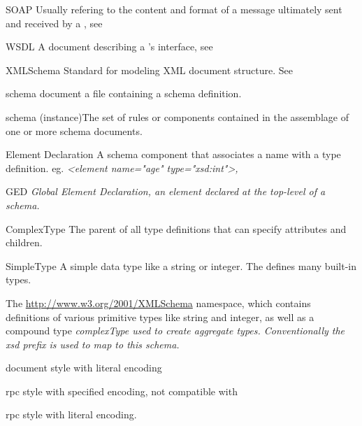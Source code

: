 \begin{definitions}
\item{SOAP \newline Usually refering to the content and format of a message ultimately
sent and received by a \WS{}, see \SOAP{}}
\item{WSDL \newline A document describing a \WS{}'s interface, see
\WSDL{}}
\item{XMLSchema \newline Standard for modeling XML document
structure.  See \XMLSchema{}}
\item {schema document \newline a file containing a schema definition.}
\item {schema (instance)\newline The set of rules or components contained in the
assemblage of one or more schema documents.}
\item{Element Declaration \newline A schema component that associates a
name with a type definition.  eg. \it{<element name="age" type="xsd:int">}, }
\item{GED \newline \it{Global Element Declaration}, an element declared at the
top-level of a schema.}
\item{ComplexType \newline The parent of all type definitions that can
specify attributes and children.}
\item{SimpleType \newline A simple data type like a string or integer.  The
\XMLSchema{} defines many built-in types. }
\item{\XSD \newline The \url{http://www.w3.org/2001/XMLSchema} namespace, which
contains definitions of various primitive types like string and integer, as well
as a compound type \it{complexType} used to create aggregate types.
Conventionally the \emph{xsd} prefix is used to map to this schema.}
\item{\DOCLIT\newline document style with literal encoding}
\item{\RPCENC\newline rpc style with specified encoding, not compatible with
\WSI}
\item{\RPCLIT\newline rpc style with literal encoding.}
\end{definitions}

